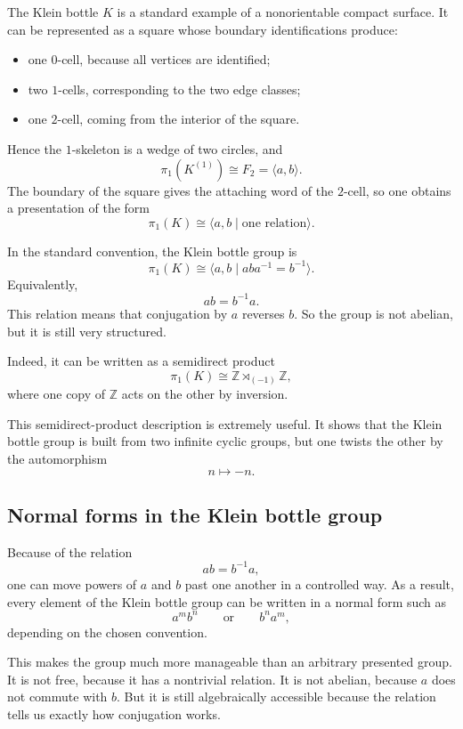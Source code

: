 \documentclass[12pt,a4paper]{article}
\theoremstyle{notespace}
\begin{document}
The Klein bottle \(K\) is a standard example of a nonorientable compact surface. It can be represented as a square whose boundary identifications produce:

\begin{itemize}
	\item one \(0\)-cell, because all vertices are identified;
	\item two \(1\)-cells, corresponding to the two edge classes;
	\item one \(2\)-cell, coming from the interior of the square.
\end{itemize}

Hence the \(1\)-skeleton is a wedge of two circles, and
\[
\pi_1(K^{(1)})\cong F_2=\langle a,b\rangle.
\]
The boundary of the square gives the attaching word of the \(2\)-cell, so one obtains a presentation of the form
\[
\pi_1(K)\cong \langle a,b\mid \text{one relation}\rangle.
\]

In the standard convention, the Klein bottle group is
\[
\pi_1(K)\cong \langle a,b\mid aba^{-1}=b^{-1}\rangle.
\]
Equivalently,
\[
ab=b^{-1}a.
\]
This relation means that conjugation by \(a\) reverses \(b\). So the group is not abelian, but it is still very structured.

Indeed, it can be written as a semidirect product
\[
\pi_1(K)\cong \mathbb Z\rtimes_{(-1)}\mathbb Z,
\]
where one copy of \(\mathbb Z\) acts on the other by inversion.

This semidirect-product description is extremely useful. It shows that the Klein bottle group is built from two infinite cyclic groups, but one twists the other by the automorphism
\[
n\mapsto -n.
\]

\subsection{Normal forms in the Klein bottle group}

Because of the relation
\[
ab=b^{-1}a,
\]
one can move powers of \(a\) and \(b\) past one another in a controlled way. As a result, every element of the Klein bottle group can be written in a normal form such as
\[
a^m b^n
\qquad\text{or}\qquad
b^n a^m,
\]
depending on the chosen convention.

This makes the group much more manageable than an arbitrary presented group. It is not free, because it has a nontrivial relation. It is not abelian, because \(a\) does not commute with \(b\). But it is still algebraically accessible because the relation tells us exactly how conjugation works.
\end{document}
